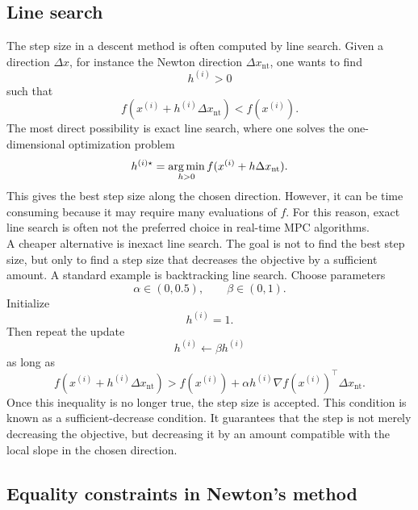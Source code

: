 \subsection{Line search}

The step size in a descent method is often computed by line search. Given a direction
\(\Delta x\), for instance the Newton direction \(\Delta x_{\mathrm{nt}}\), one wants to find
\[
    h^{(i)}>0
\]
such that
\[
    f(x^{(i)}+h^{(i)}\Delta x_{\mathrm{nt}})
    <
    f(x^{(i)}).
\]
The most direct possibility is exact line search, where one solves the one-dimensional
optimization problem
\[
    h^{(i)\star}
    =
    \operatorname*{arg\,min}_{h>0}
    f(x^{(i)}+h\Delta x_{\mathrm{nt}}).
\]
This gives the best step size along the chosen direction. However, it can be time consuming
because it may require many evaluations of \(f\). For this reason, exact line search is often not
the preferred choice in real-time MPC algorithms.\\

A cheaper alternative is inexact line search. The goal is not to find the best step size, but only
to find a step size that decreases the objective by a sufficient amount. A standard example is
backtracking line search. Choose parameters
\[
    \alpha\in(0,0.5),
    \qquad
    \beta\in(0,1).
\]
Initialize
\[
    h^{(i)}=1.
\]
Then repeat the update
\[
    h^{(i)}\leftarrow \beta h^{(i)}
\]
as long as
\[
    f(x^{(i)}+h^{(i)}\Delta x_{\mathrm{nt}})
    >
    f(x^{(i)})
    +
    \alpha h^{(i)}
    \nabla f(x^{(i)})^\top \Delta x_{\mathrm{nt}}.
\]
Once this inequality is no longer true, the step size is accepted. This condition is known as a
sufficient-decrease condition. It guarantees that the step is not merely decreasing the objective,
but decreasing it by an amount compatible with the local slope in the chosen direction.

\subsection{Equality constraints in Newton's method}


